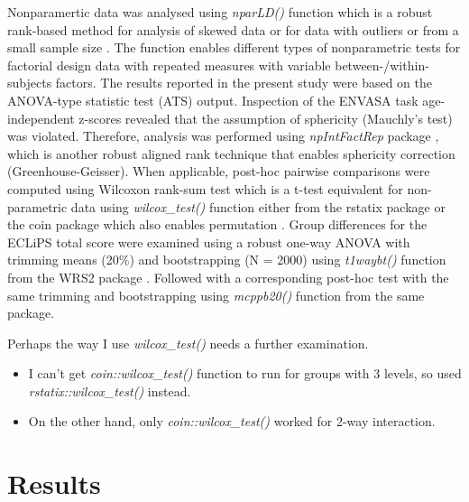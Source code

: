 \documentclass[a4paper, twoside]{templates/ociamthesis}
\providecommand{\tightlist}{%
  \setlength{\itemsep}{0pt}\setlength{\parskip}{0pt}}
\begin{document}
Nonparamertic data was analysed using \emph{nparLD()} function \autocite[nparLD package;][]{nparLDPackageR} which is a robust rank-based method for analysis of skewed data or for data with outliers or from a small sample size \autocite[see][ for a good introduction on robust nonparametric techniques]{Feys2016}. The function enables different types of nonparametric tests for factorial design data with repeated measures with variable between-/within-subjects factors. The results reported in the present study were based on the ANOVA-type statistic test (ATS) output. Inspection of the ENVASA task age-independent z-scores revealed that the assumption of sphericity (Mauchly's test) was violated. Therefore, analysis was performed using \emph{npIntFactRep} package \autocite{npIntFactRepPackageR}, which is another robust aligned rank technique that enables sphericity correction (Greenhouse-Geisser). When applicable, post-hoc pairwise comparisons were computed using Wilcoxon rank-sum test which is a t-test equivalent for non-parametric data using \emph{wilcox\_test()} function either from the rstatix package \autocite{rstatixPackageR} or the coin package which also enables permutation \autocite{CoinPackageR}. Group differences for the ECLiPS total score were examined using a robust one-way ANOVA with trimming means (20\%) and bootstrapping (N = 2000) using \emph{t1waybt()} function from the WRS2 package \autocite{WRS2PackageR}. Followed with a corresponding post-hoc test with the same trimming and bootstrapping using \emph{mcppb20()} function from the same package.\\

\begin{correction}
Perhaps the way I use \emph{wilcox\_test()} needs a further examination.

\begin{itemize}
\tightlist
\item
  I can't get \emph{coin::wilcox\_test()} function to run for groups
  with 3 levels, so used \emph{rstatix::wilcox\_test()} instead.
\item
  On the other hand, only \emph{coin::wilcox\_test()} worked for 2-way
  interaction.
\end{itemize}
\end{correction}

\hypertarget{results-3}{%
\section{Results}\label{results-3}}
\end{document}
